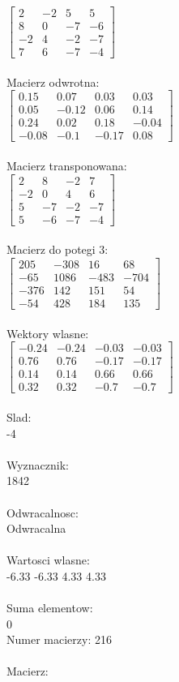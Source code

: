 \documentclass[a4paper,12pt]{article}
\begin{document}
$\begin{bmatrix} 2&-2&5&5\\8&0&-7&-6\\-2&4&-2&-7\\7&6&-7&-4 \end{bmatrix}$
\\
\\
Macierz odwrotna:\\

$\begin{bmatrix} 0.15&0.07&0.03&0.03\\0.05&-0.12&0.06&0.14\\0.24&0.02&0.18&-0.04\\-0.08&-0.1&-0.17&0.08 \end{bmatrix}$
\\
\\
Macierz transponowana:\\

$\begin{bmatrix} 2&8&-2&7\\-2&0&4&6\\5&-7&-2&-7\\5&-6&-7&-4 \end{bmatrix}$
\\
\\
Macierz do potegi 3:\\

$\begin{bmatrix} 205&-308&16&68\\-65&1086&-483&-704\\-376&142&151&54\\-54&428&184&135 \end{bmatrix}$
\\
\\
Wektory wlasne:\\

$\begin{bmatrix} -0.24&-0.24&-0.03&-0.03\\0.76&0.76&-0.17&-0.17\\0.14&0.14&0.66&0.66\\0.32&0.32&-0.7&-0.7 \end{bmatrix}$
\\
\\
Slad:\\
-4
\\
\\
Wyznacznik:\\
1842
\\
\\
Odwracalnosc:\\
Odwracalna
\\
\\
Wartosci wlasne:\\
-6.33 -6.33 4.33 4.33
\\
\\
Suma elementow:\\
0
\\
\newpage
Numer macierzy:
216
\\
\\
Macierz:\\
\end{document}
